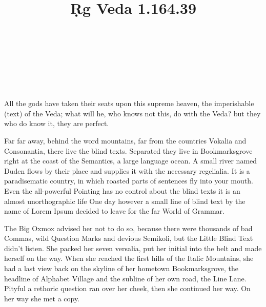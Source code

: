 \documentclass{xminimal}
\title{Ṛg Veda 1.164.39}
\author{\relax}
\date{\relax}
\begin{document}

\maketitle
\thispagestyle{empty}

 \danda \\
 \ddanda

 \danda \\
 \ddanda

 \danda \\
 \ddanda

All the gods have taken their seats upon this supreme heaven, the imperishable
(text) of the Veda; what will he, who knows not this, do with the Veda?
but they who do know it, they are perfect.

Far far away, behind the word mountains, far from the countries Vokalia and
Consonantia, there live the blind texts. Separated they live in Bookmarksgrove
right at the coast of the Semantics, a large language ocean. A small river
named Duden flows by their place and supplies it with the necessary regelialia.
It is a paradisematic country, in which roasted parts of sentences fly into
your mouth. Even the all-powerful Pointing has no control about the blind texts
it is an almost unorthographic life One day however a small line of blind text
by the name of Lorem Ipsum decided to leave for the far World of Grammar.

The Big Oxmox advised her not to do so, because there were thousands of bad
Commas, wild Question Marks and devious Semikoli, but the Little Blind Text
didn’t listen. She packed her seven versalia, put her initial into the belt
and made herself on the way. When she reached the first hills of the Italic
Mountains, she had a last view back on the skyline of her hometown
Bookmarksgrove, the headline of Alphabet Village and the subline of her own
road, the Line Lane. Pityful a rethoric question ran over her cheek, then she
continued her way. On her way she met a copy.
\end{document}
